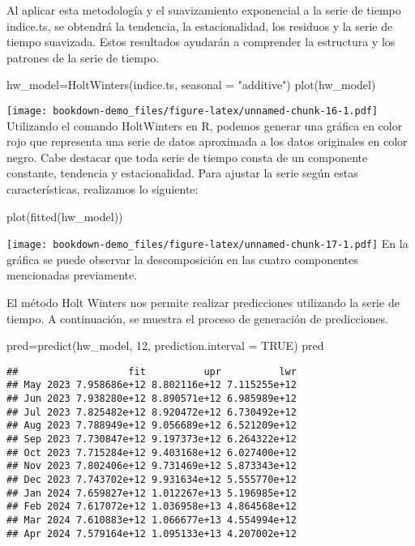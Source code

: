 \documentclass[
]{book}
\newenvironment{Shaded}{\begin{snugshade}}{\end{snugshade}}
\newcommand{\AttributeTok}[1]{\textcolor[rgb]{0.77,0.63,0.00}{#1}}
\newcommand{\ConstantTok}[1]{\textcolor[rgb]{0.00,0.00,0.00}{#1}}
\newcommand{\DecValTok}[1]{\textcolor[rgb]{0.00,0.00,0.81}{#1}}
\newcommand{\FunctionTok}[1]{\textcolor[rgb]{0.00,0.00,0.00}{#1}}
\newcommand{\NormalTok}[1]{#1}
\newcommand{\OtherTok}[1]{\textcolor[rgb]{0.56,0.35,0.01}{#1}}
\newcommand{\StringTok}[1]{\textcolor[rgb]{0.31,0.60,0.02}{#1}}
\begin{document}
Al aplicar esta metodología y el suavizamiento exponencial a la serie de tiempo indice.ts, se obtendrá la tendencia, la estacionalidad, los residuos y la serie de tiempo suavizada. Estos resultados ayudarán a comprender la estructura y los patrones de la serie de tiempo.

\begin{Shaded}
\begin{Highlighting}[]
\NormalTok{hw\_model}\OtherTok{=}\FunctionTok{HoltWinters}\NormalTok{(indice.ts, }\AttributeTok{seasonal =} \StringTok{"additive"}\NormalTok{)}
\FunctionTok{plot}\NormalTok{(hw\_model)}
\end{Highlighting}
\end{Shaded}

\texttt{[image: bookdown-demo\_files/figure-latex/unnamed-chunk-16-1.pdf]}
Utilizando el comando HoltWinters en R, podemos generar una gráfica en color rojo que representa una serie de datos aproximada a los datos originales en color negro. Cabe destacar que toda serie de tiempo consta de un componente constante, tendencia y estacionalidad. Para ajustar la serie según estas características, realizamos lo siguiente:

\begin{Shaded}
\begin{Highlighting}[]
\FunctionTok{plot}\NormalTok{(}\FunctionTok{fitted}\NormalTok{(hw\_model))}
\end{Highlighting}
\end{Shaded}

\texttt{[image: bookdown-demo\_files/figure-latex/unnamed-chunk-17-1.pdf]}
En la gráfica se puede observar la descomposición en las cuatro componentes mencionadas previamente.

El método Holt Winters nos permite realizar predicciones utilizando la serie de tiempo. A continuación, se muestra el proceso de generación de predicciones.

\begin{Shaded}
\begin{Highlighting}[]
\NormalTok{pred}\OtherTok{=}\FunctionTok{predict}\NormalTok{(hw\_model, }\DecValTok{12}\NormalTok{, }\AttributeTok{prediction.interval =} \ConstantTok{TRUE}\NormalTok{)}
\NormalTok{pred}
\end{Highlighting}
\end{Shaded}

\begin{verbatim}
##                   fit          upr          lwr
## May 2023 7.958686e+12 8.802116e+12 7.115255e+12
## Jun 2023 7.938280e+12 8.890571e+12 6.985989e+12
## Jul 2023 7.825482e+12 8.920472e+12 6.730492e+12
## Aug 2023 7.788949e+12 9.056689e+12 6.521209e+12
## Sep 2023 7.730847e+12 9.197373e+12 6.264322e+12
## Oct 2023 7.715284e+12 9.403168e+12 6.027400e+12
## Nov 2023 7.802406e+12 9.731469e+12 5.873343e+12
## Dec 2023 7.743702e+12 9.931634e+12 5.555770e+12
## Jan 2024 7.659827e+12 1.012267e+13 5.196985e+12
## Feb 2024 7.617072e+12 1.036958e+13 4.864568e+12
## Mar 2024 7.610883e+12 1.066677e+13 4.554994e+12
## Apr 2024 7.579164e+12 1.095133e+13 4.207002e+12
\end{verbatim}
\end{document}
